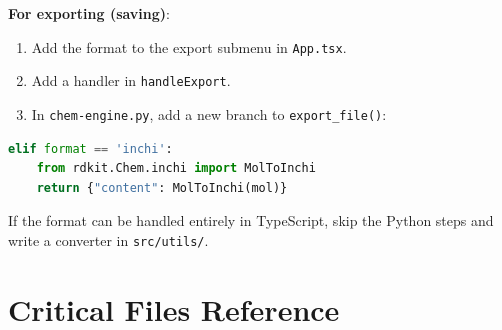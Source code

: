 \documentclass[11pt,a4paper]{article}
\begin{document}
\textbf{For exporting (saving)}:
\begin{enumerate}[leftmargin=1.5em]
  \item Add the format to the export submenu in \texttt{App.tsx}.
  \item Add a handler in \lstinline|handleExport|.
  \item In \texttt{chem-engine.py}, add a new branch to \lstinline|export_file()|:
\end{enumerate}
\begin{lstlisting}[language=Python]
elif format == 'inchi':
    from rdkit.Chem.inchi import MolToInchi
    return {"content": MolToInchi(mol)}
\end{lstlisting}

If the format can be handled entirely in TypeScript, skip the Python steps and write
a converter in \texttt{src/utils/}.

\section{Critical Files Reference}
\label{sec:files}
\end{document}
